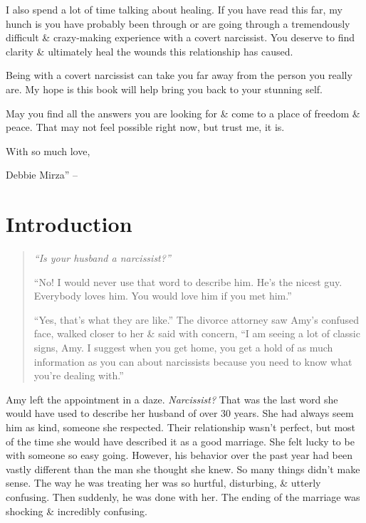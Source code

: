 \documentclass{article}
\numberwithin{equation}{section}
\begin{document}
I also spend a lot of time talking about healing. If you have read this far, my hunch is you have probably been through or are going through a tremendously difficult \& crazy-making experience with a covert narcissist. You deserve to find clarity \& ultimately heal the wounds this relationship has caused.

Being with a covert narcissist can take you far away from the person you really are. My hope is this book will help bring you back to your stunning self.

May you find all the answers you are looking for \& come to a place of freedom \& peace. That may not feel possible right now, but trust me, it is.

With so much love,

Debbie Mirza'' -- \cite[pp. 9--12]{Mirza2017}


\section*{Introduction}

\begin{quotation}\it
	``Is your husband a narcissist?''
	
	``No! I would never use that word to describe him. He's the nicest guy. Everybody loves him. You would love him if you met him.''
	
	``Yes, that's what they are like.'' The divorce attorney saw Amy's confused face, walked closer to her \& said with concern, ``I am seeing a lot of classic signs, Amy. I suggest when you get home, you get a hold of as much information as you can about narcissists because you need to know what you're dealing with.''
\end{quotation}
Amy left the appointment in a daze. \textit{Narcissist?} That was the last word she would have used to describe her husband of over 30 years. She had always seem him as kind, someone she respected. Their relationship wasn't perfect, but most of the time she would have described it as a good marriage. She felt lucky to be with someone so easy going. However, his behavior over the past year had been vastly different than the man she thought she knew. So many things didn't make sense. The way he was treating her was so hurtful, disturbing, \& utterly confusing. Then suddenly, he was done with her. The ending of the marriage was shocking \& incredibly confusing.
\end{document}
